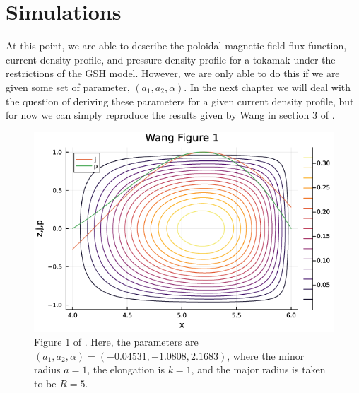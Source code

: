 \section{Simulations}
At this point, we are able to describe the poloidal magnetic field flux function, current density profile, and pressure density profile for a 
tokamak under the restrictions of the GSH model. However, we are only able to do this if we are given some set of parameter, $(a_1, a_2, \alpha)$. 
In the next chapter we will deal with the question of deriving these parameters for a given current density profile, but for now we can simply reproduce 
the results given by Wang in section 3 of \cite{wang-analytic-solution}.

\begin{figure}[h!]
    \centering
    \includegraphics[scale=0.6]{imgs/c3/wang-fig-1.png}
    \caption{Figure 1 of \cite{wang-analytic-solution}. Here, the parameters are $(a_1, a_2, \alpha) = (-0.04531, -1.0808, 2.1683)$, 
    where the minor radius $a = 1$, the elongation is $k = 1$, and the major radius is taken to be $R = 5$.}
\end{figure}


